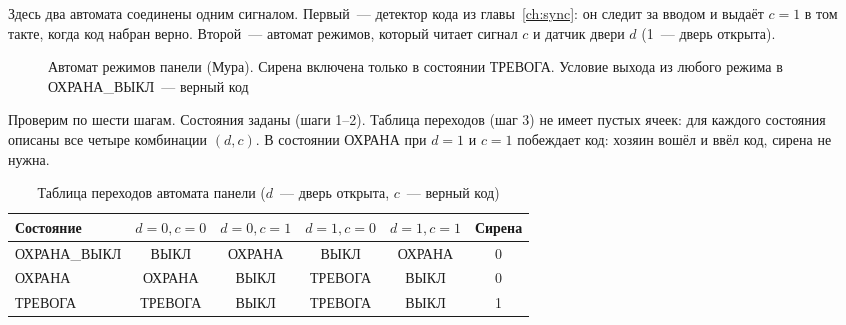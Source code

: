 Здесь два автомата соединены одним сигналом. Первый~--- детектор кода из
главы~\ref{ch:sync}: он следит за вводом и выдаёт $c=1$ в том такте, когда код
набран верно. Второй~--- автомат режимов, который читает сигнал $c$ и датчик
двери $d$ (1~--- дверь открыта).

\begin{figure}[H]
\centering
{}
\caption{Автомат режимов панели (Мура). Сирена включена только в состоянии
ТРЕВОГА. Условие выхода из любого режима в ОХРАНА\_ВЫКЛ~--- верный код}
\label{fig:panel_fsm}
\end{figure}

Проверим по шести шагам. Состояния заданы (шаги 1--2). Таблица переходов
(шаг 3) не имеет пустых ячеек: для каждого состояния описаны все четыре
комбинации $(d,c)$. В состоянии ОХРАНА при $d=1$ и $c=1$ побеждает код:
хозяин вошёл и ввёл код, сирена не нужна.

\begin{table}[H]
\centering
\caption{Таблица переходов автомата панели ($d$~--- дверь открыта, $c$~--- верный код)}
\small
\begin{tabular}{l|cccc|c}
\toprule
\textbf{Состояние} & $d{=}0,c{=}0$ & $d{=}0,c{=}1$ & $d{=}1,c{=}0$ & $d{=}1,c{=}1$ & \textbf{Сирена} \\
\midrule
ОХРАНА\_ВЫКЛ & ВЫКЛ & ОХРАНА & ВЫКЛ & ОХРАНА & 0 \\
ОХРАНА       & ОХРАНА & ВЫКЛ & ТРЕВОГА & ВЫКЛ & 0 \\
ТРЕВОГА      & ТРЕВОГА & ВЫКЛ & ТРЕВОГА & ВЫКЛ & 1 \\
\bottomrule
\end{tabular}
\end{table}

